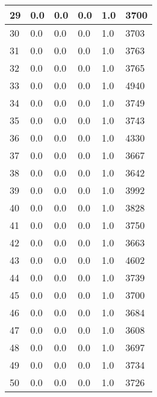 \begin{longtable}{|l|l|l|l|l|l|}
29 & 0.0 & 0.0 & 0.0 & 1.0 & 3700 \\ \hline 
30 & 0.0 & 0.0 & 0.0 & 1.0 & 3703 \\ \hline 
31 & 0.0 & 0.0 & 0.0 & 1.0 & 3763 \\ \hline 
32 & 0.0 & 0.0 & 0.0 & 1.0 & 3765 \\ \hline 
33 & 0.0 & 0.0 & 0.0 & 1.0 & 4940 \\ \hline 
34 & 0.0 & 0.0 & 0.0 & 1.0 & 3749 \\ \hline 
35 & 0.0 & 0.0 & 0.0 & 1.0 & 3743 \\ \hline 
36 & 0.0 & 0.0 & 0.0 & 1.0 & 4330 \\ \hline 
37 & 0.0 & 0.0 & 0.0 & 1.0 & 3667 \\ \hline 
38 & 0.0 & 0.0 & 0.0 & 1.0 & 3642 \\ \hline 
39 & 0.0 & 0.0 & 0.0 & 1.0 & 3992 \\ \hline 
40 & 0.0 & 0.0 & 0.0 & 1.0 & 3828 \\ \hline 
41 & 0.0 & 0.0 & 0.0 & 1.0 & 3750 \\ \hline 
42 & 0.0 & 0.0 & 0.0 & 1.0 & 3663 \\ \hline 
43 & 0.0 & 0.0 & 0.0 & 1.0 & 4602 \\ \hline 
44 & 0.0 & 0.0 & 0.0 & 1.0 & 3739 \\ \hline 
45 & 0.0 & 0.0 & 0.0 & 1.0 & 3700 \\ \hline 
46 & 0.0 & 0.0 & 0.0 & 1.0 & 3684 \\ \hline 
47 & 0.0 & 0.0 & 0.0 & 1.0 & 3608 \\ \hline 
48 & 0.0 & 0.0 & 0.0 & 1.0 & 3697 \\ \hline 
49 & 0.0 & 0.0 & 0.0 & 1.0 & 3734 \\ \hline 
50 & 0.0 & 0.0 & 0.0 & 1.0 & 3726 \\ \hline 
\end{longtable}